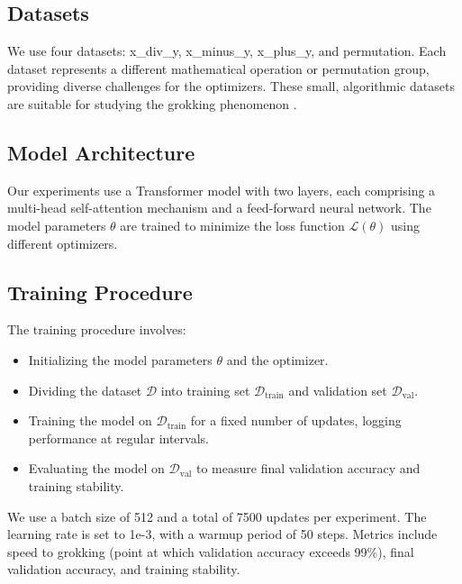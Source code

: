 \documentclass{article} %
\begin{document}
\subsection{Datasets}
We use four datasets: x\_div\_y, x\_minus\_y, x\_plus\_y, and permutation. Each dataset represents a different mathematical operation or permutation group, providing diverse challenges for the optimizers. These small, algorithmic datasets are suitable for studying the grokking phenomenon \cite{power2022grokking}.

\subsection{Model Architecture}
Our experiments use a Transformer model \cite{vaswani2017attention} with two layers, each comprising a multi-head self-attention mechanism and a feed-forward neural network. The model parameters \( \theta \) are trained to minimize the loss function \( \mathcal{L}(\theta) \) using different optimizers.

\subsection{Training Procedure}
The training procedure involves:
\begin{itemize}
    \item Initializing the model parameters \( \theta \) and the optimizer.
    \item Dividing the dataset \( \mathcal{D} \) into training set \( \mathcal{D}_{\text{train}} \) and validation set \( \mathcal{D}_{\text{val}} \).
    \item Training the model on \( \mathcal{D}_{\text{train}} \) for a fixed number of updates, logging performance at regular intervals.
    \item Evaluating the model on \( \mathcal{D}_{\text{val}} \) to measure final validation accuracy and training stability.
\end{itemize}
We use a batch size of 512 and a total of 7500 updates per experiment. The learning rate is set to 1e-3, with a warmup period of 50 steps. Metrics include speed to grokking (point at which validation accuracy exceeds 99\%), final validation accuracy, and training stability.
\end{document}

